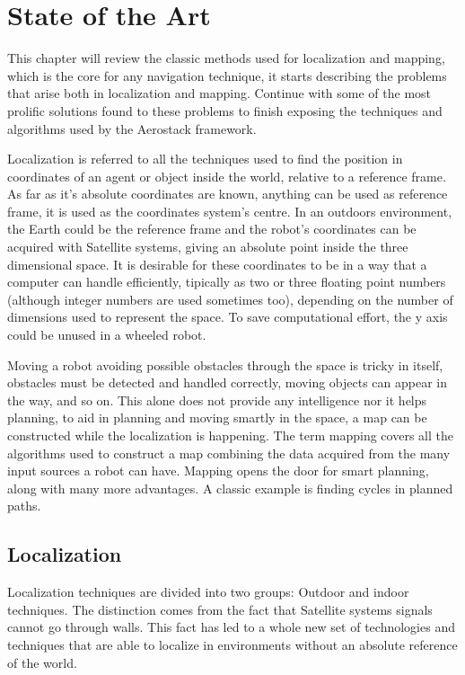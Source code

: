 \chapter{State of the Art}

  This chapter will review the classic methods used for localization and mapping, which is the core for any navigation technique, it starts describing the problems that arise both in localization and mapping. Continue with some of the most prolific solutions found to these problems to finish exposing the techniques and algorithms used by the Aerostack framework.

  Localization is referred to all the techniques used to find the position in coordinates of an agent or object inside the world, relative to a reference frame. As far as it's absolute coordinates are known, anything can be used as reference frame, it is used as the coordinates system's centre. In an outdoors environment, the Earth could be the reference frame and the robot's coordinates can be acquired with Satellite systems, giving an absolute point inside the three dimensional space. It is desirable for these coordinates to be in a way that a computer can handle efficiently, tipically as two or three floating point numbers (although integer numbers are used sometimes too), depending on the number of dimensions used to represent the space. To save computational effort, the y axis could be unused in a wheeled robot.

  Moving a robot avoiding possible obstacles through the space is tricky in itself, obstacles must be detected and handled correctly, moving objects can appear in the way, and so on. This alone does not provide any intelligence nor it helps planning, to aid in planning and moving smartly in the space, a map can be constructed while the localization is happening. The term mapping covers all the algorithms used to construct a map combining the data acquired from the many input sources a robot can have. Mapping opens the door for smart planning, along with many more advantages. A classic example is finding cycles in planned paths.

  \clearpage

  \section{Localization}

    Localization techniques are divided into two groups: Outdoor and indoor techniques. The distinction comes from the fact that Satellite systems signals cannot go through walls. This fact has led to a whole new set of technologies and techniques that are able to localize in environments without an absolute reference of the world.

